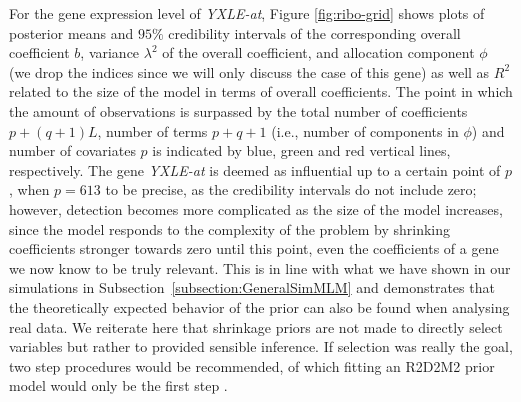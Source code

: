 For the gene expression level of \textit{YXLE-at}, Figure \ref{fig:ribo-grid} shows plots of posterior means and $95\%$ credibility intervals of the corresponding overall coefficient $b$, variance $\lambda^2$ of the overall coefficient, and allocation component $\phi$ (we drop the indices since we will only discuss the case of this gene) as well as $R^2$ related to the size of the model in terms of overall coefficients. The point in which the amount of observations is surpassed by the total number of coefficients $p+(q+1)L$, number of terms $p+q+1$ (i.e., number of components in $\phi$) and number of covariates $p$ is indicated by blue, green and red vertical lines, respectively. The gene \textit{YXLE-at} is deemed as influential up to a certain point of $p$, when $p=613$ to be precise, as the credibility intervals do not include zero; however, detection becomes more complicated as the size of the model increases, since the model responds to the complexity of the problem by shrinking coefficients stronger towards zero until this point, even the coefficients of a gene we now know to be truly relevant. This is in line with what we have shown in our simulations in Subsection~\ref{subsection:GeneralSimMLM} and demonstrates that the theoretically expected behavior of the prior can also be found when analysing real data. We reiterate here that shrinkage priors are not made to directly select variables but rather to provided sensible inference. If selection was really the goal, two step procedures would be recommended, of which fitting an R2D2M2 prior model would only be the first step \citep{PiironenProjInf, catalina2020projection}.
